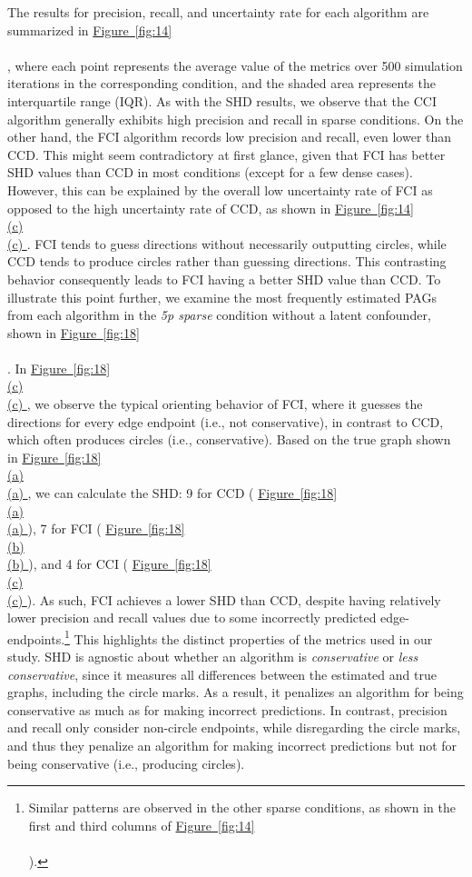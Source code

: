 \documentclass[twoside, 11pt]{article}
\newcommand*{\figref}[2][]{%
  \hyperref[{fig:#2}]{%
    Figure~\ref*{fig:#2}%
    \ifx\\#1\\%
    \else
      #1%
    \fi
  }%
}
\begin{document}
The results for precision, recall, and uncertainty rate for each algorithm are summarized in \figref[]{14}, where each point represents the average value of the metrics over 500 simulation iterations in the corresponding condition, and the shaded area represents the interquartile range (IQR). As with the SHD results, we observe that the CCI algorithm generally exhibits high precision and recall in sparse conditions. On the other hand, the FCI algorithm records low precision and recall, even lower than CCD. This might seem contradictory at first glance, given that FCI has better SHD values than CCD in most conditions (except for a few dense cases).
However, this can be explained by the overall low uncertainty rate of FCI as opposed to the high uncertainty rate of CCD, as shown in \figref[(c)]{14}. FCI tends to guess directions without necessarily outputting circles, while CCD tends to produce circles rather than guessing directions. This contrasting behavior consequently leads to FCI having a better SHD value than CCD. To illustrate this point further, we examine the most frequently estimated PAGs from each algorithm in the \textit{5p sparse} condition without a latent confounder, shown in \figref[]{18}. In \figref[(c)]{18}, we observe the typical orienting behavior of FCI, where it guesses the directions for every edge endpoint (i.e., not conservative), in contrast to CCD, which often produces circles (i.e., conservative). Based on the true graph shown in \figref[(a)]{18}, we can calculate the SHD: 9 for CCD (\figref[(a)]{18}), 7 for FCI (\figref[(b)]{18}), and 4 for CCI (\figref[(c)]{18}). 
As such, FCI achieves a lower SHD than CCD, despite having relatively lower precision and recall values due to some incorrectly predicted edge-endpoints.\footnote{Similar patterns are observed in the other sparse conditions, as shown in the first and third columns of \figref[]{14}).} 
This highlights the distinct properties of the metrics used in our study. 
SHD is agnostic about whether an algorithm is \textit{conservative} or \textit{less conservative}, since it measures all differences between the estimated and true graphs, including the circle marks. As a result, it penalizes an algorithm for being conservative as much as for making incorrect predictions.
In contrast, precision and recall only consider non-circle endpoints, while disregarding the circle marks, and thus they penalize an algorithm for making incorrect predictions but not for being conservative (i.e., producing circles).
\end{document}
